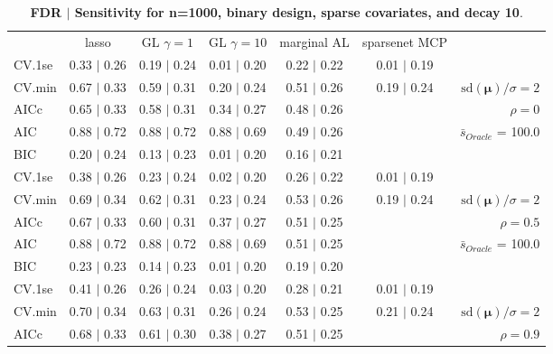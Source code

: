 \begin{table}\vspace{-.5cm}
\caption[l]{ {\it }
{ \bf FDR $\boldsymbol{\mid}$ Sensitivity for n=1000, binary design, sparse covariates, and  decay  10}.}
\vspace{-.5cm}
\footnotesize{}
\begin{center}
\begin{tabular}{l*{5}{c}|r}
 & lasso & GL $\gamma=1$ & GL $\gamma=10$ & marginal AL & sparsenet MCP  & \\
 \cline{1-7}
CV.1se & 0.33 $\mid$ 0.26 & 0.19 $\mid$ 0.24 & 0.01 $\mid$ 0.20 & 0.22 $\mid$ 0.22 & 0.01 $\mid$ 0.19 & \\
CV.min & 0.67 $\mid$ 0.33 & 0.59 $\mid$ 0.31 & 0.20 $\mid$ 0.24 & 0.51 $\mid$ 0.26 & 0.19 $\mid$ 0.24 &  $\mathrm{sd}(\mathbf{\mu})/\sigma=2$ \\
AICc & 0.65 $\mid$ 0.33 & 0.58 $\mid$ 0.31 & 0.34 $\mid$ 0.27 & 0.48 $\mid$ 0.26 & & $\rho=0$ \\
AIC & 0.88 $\mid$ 0.72 & 0.88 $\mid$ 0.72 & 0.88 $\mid$ 0.69 & 0.49 $\mid$ 0.26 & &  \multirow{2}{*}{$\bar{s}_{Oracle}$ = 100.0} \\
BIC & 0.20 $\mid$ 0.24 & 0.13 $\mid$ 0.23 & 0.01 $\mid$ 0.20 & 0.16 $\mid$ 0.21 & &  \\
 \hline 
CV.1se & 0.38 $\mid$ 0.26 & 0.23 $\mid$ 0.24 & 0.02 $\mid$ 0.20 & 0.26 $\mid$ 0.22 & 0.01 $\mid$ 0.19 & \\
CV.min & 0.69 $\mid$ 0.34 & 0.62 $\mid$ 0.31 & 0.23 $\mid$ 0.24 & 0.53 $\mid$ 0.26 & 0.19 $\mid$ 0.24 &  $\mathrm{sd}(\mathbf{\mu})/\sigma=2$ \\
AICc & 0.67 $\mid$ 0.33 & 0.60 $\mid$ 0.31 & 0.37 $\mid$ 0.27 & 0.51 $\mid$ 0.25 & & $\rho=0.5$ \\
AIC & 0.88 $\mid$ 0.72 & 0.88 $\mid$ 0.72 & 0.88 $\mid$ 0.69 & 0.51 $\mid$ 0.25 & &  \multirow{2}{*}{$\bar{s}_{Oracle}$ = 100.0} \\
BIC & 0.23 $\mid$ 0.23 & 0.14 $\mid$ 0.23 & 0.01 $\mid$ 0.20 & 0.19 $\mid$ 0.20 & &  \\
 \hline 
CV.1se & 0.41 $\mid$ 0.26 & 0.26 $\mid$ 0.24 & 0.03 $\mid$ 0.20 & 0.28 $\mid$ 0.21 & 0.01 $\mid$ 0.19 & \\
CV.min & 0.70 $\mid$ 0.34 & 0.63 $\mid$ 0.31 & 0.26 $\mid$ 0.24 & 0.53 $\mid$ 0.25 & 0.21 $\mid$ 0.24 &  $\mathrm{sd}(\mathbf{\mu})/\sigma=2$ \\
AICc & 0.68 $\mid$ 0.33 & 0.61 $\mid$ 0.30 & 0.38 $\mid$ 0.27 & 0.51 $\mid$ 0.25 & & $\rho=0.9$ \\

\end{tabular}
\end{center}
\end{table}
